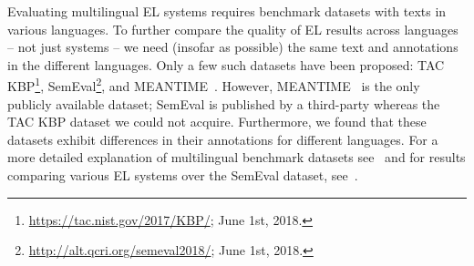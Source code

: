 \documentclass{llncs}
\newcommand{\cmark}{\ding{51}}%
\newcommand{\xmark}{}%
\begin{document}




Evaluating multilingual EL systems requires benchmark datasets with texts in various languages. To further compare the quality of EL results across languages -- not just systems -- we need (insofar as possible) the same text and annotations in the different languages. Only a few such datasets have been proposed: TAC KBP\footnote{\url{https://tac.nist.gov/2017/KBP/}; June 1st, 2018.}, SemEval\footnote{\url{http://alt.qcri.org/semeval2018/}; June 1st, 2018.}, and MEANTIME~\cite{meantime16}. However, MEANTIME~\cite{meantime16} is the only publicly available dataset; SemEval is published by a third-party whereas the TAC KBP dataset we could not acquire. Furthermore, we found that these datasets exhibit differences in their annotations for different languages. For a more detailed explanation of multilingual benchmark datasets see~\cite{ourISWC} and for results comparing various EL systems over the SemEval dataset, see~\cite{ourLD4ID2017}.
\end{document}
